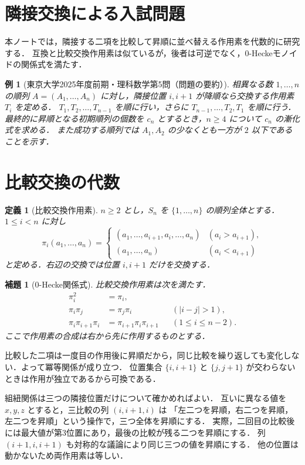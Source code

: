 \documentclass[a5paper,10pt,onecolumn]{jsarticle}
\makeatletter
\theoremstyle{mathnotetheorem}
\newtheorem{definition}[theorem]{定義}
\newtheorem{lemma}[theorem]{補題}
\newtheorem{example}[theorem]{例}
\renewcommand{\proofname}{証明}
\renewenvironment{proof}[1][\proofname]{%
  \par\pushQED{\qed}\normalfont\topsep4\p@\@plus2\p@\relax
  \trivlist\item[\hskip\labelsep\bfseries #1]\ignorespaces
}{\popQED\endtrivlist\@endpefalse}
\makeatother
\begin{document}
\section{隣接交換による入試問題}
本ノートでは，隣接する二項を比較して昇順に並べ替える作用素を代数的に研究する．
互換と比較交換作用素は似ているが，後者は可逆でなく，0-Heckeモノイドの関係式を満たす．

\begin{example}[東京大学2025年度前期・理科数学第5問（問題の要約）]\label{ex:tokyo}
相異なる数 $1,\ldots,n$ の順列 $A=(A_1,\ldots,A_n)$ に対し，隣接位置 $i,i+1$ が降順なら交換する作用素 $T_i$ を定める．
$T_1,T_2,\ldots,T_{n-1}$ を順に行い，さらに $T_{n-1},\ldots,T_2,T_1$ を順に行う．
最終的に昇順となる初期順列の個数を $c_n$ とするとき，$n\ge4$ について $c_n$ の漸化式を求める．
また成功する順列では $A_1,A_2$ の少なくとも一方が $2$ 以下であることを示す．
\end{example}

\section{比較交換の代数}
\begin{definition}[比較交換作用素]
$n\ge2$ とし，$S_n$ を $\{1,\ldots,n\}$ の順列全体とする．
$1\le i<n$ に対し
\[
 \pi_i(a_1,\ldots,a_n)=
 \begin{cases}
 (a_1,\ldots,a_{i+1},a_i,\ldots,a_n)&(a_i>a_{i+1}),\\
 (a_1,\ldots,a_n)&(a_i<a_{i+1})
 \end{cases}
\]
と定める．右辺の交換では位置 $i,i+1$ だけを交換する．
\end{definition}

\begin{lemma}[0-Hecke関係式]\label{lem:hecke}
比較交換作用素は次を満たす．
\begin{align*}
 \pi_i^2&=\pi_i,\\
 \pi_i\pi_j&=\pi_j\pi_i&&(|i-j|>1),\\
 \pi_i\pi_{i+1}\pi_i&=\pi_{i+1}\pi_i\pi_{i+1}
 &&(1\le i\le n-2).
\end{align*}
ここで作用素の合成は右から先に作用するものとする．
\end{lemma}
\begin{proof}
比較した二項は一度目の作用後に昇順だから，同じ比較を繰り返しても変化しない．よって冪等関係が成り立つ．
位置集合 $\{i,i+1\}$ と $\{j,j+1\}$ が交わらないときは作用が独立であるから可換である．

組紐関係は三つの隣接位置だけについて確かめればよい．
互いに異なる値を $x,y,z$ とすると，三比較の列 $(i,i+1,i)$ は
「左二つを昇順，右二つを昇順，左二つを昇順」という操作で，三つ全体を昇順にする．
実際，二回目の比較後には最大値が第3位置にあり，最後の比較が残る二つを昇順にする．
列 $(i+1,i,i+1)$ も対称的な議論により同じ三つの値を昇順にする．
他の位置は動かないため両作用素は等しい．
\end{proof}
\end{document}
